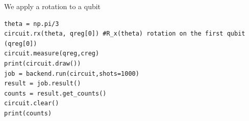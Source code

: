 \documentclass{beamer}
\begin{document}
\begin{frame}
\begin{verbatim}
\end{verbatim}


We apply a rotation to a qubit











\begin{verbatim}
theta = np.pi/3
circuit.rx(theta, qreg[0]) #R_x(theta) rotation on the first qubit (qreg[0])
circuit.measure(qreg,creg)
print(circuit.draw())
job = backend.run(circuit,shots=1000)
result = job.result()
counts = result.get_counts()
circuit.clear()
print(counts)

\end{verbatim}
\end{frame}
\end{document}

